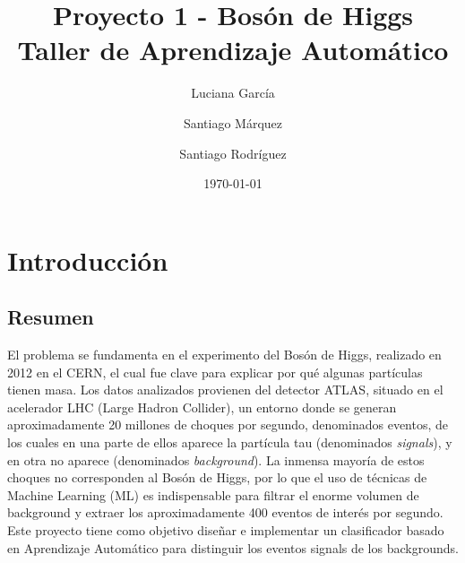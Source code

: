 \documentclass{article}
\title{\textbf{Proyecto 1 - Bosón de Higgs}\\Taller de Aprendizaje Automático}
\author{Luciana García  \and Santiago Márquez \and Santiago Rodríguez}
\date{\today}
\begin{document}
\maketitle


\section{Introducción}
\subsection{Resumen}
El problema se fundamenta en el experimento del Bosón de Higgs, realizado en 2012 en el CERN, el cual fue clave para explicar por qué algunas partículas tienen masa. Los datos analizados provienen del detector ATLAS, situado en el acelerador LHC (Large Hadron Collider), un entorno donde se generan aproximadamente 20 millones de choques por segundo, denominados eventos, de los cuales en una parte de ellos aparece la partícula tau (denominados  \textit{signals}), y en otra no aparece (denominados \textit{background}).
La inmensa mayoría de estos choques no corresponden al Bosón de Higgs, por lo que el uso de técnicas de Machine Learning (ML) es indispensable para filtrar el enorme volumen de background y extraer los aproximadamente 400 eventos de interés por segundo. Este proyecto tiene como objetivo diseñar e implementar un clasificador basado en Aprendizaje Automático para distinguir los eventos signals de los backgrounds.
\end{document}
